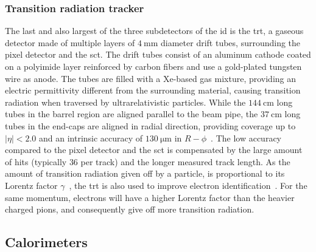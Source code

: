 \subsubsection{Transition radiation tracker}

The last and also largest of the three subdetectors of the \gls{id} is the \gls{trt}, a gaseous detector made of multiple layers of $\SI{4}{\milli\meter}$ diameter drift tubes, surrounding the pixel detector and the \gls{sct}. The drift tubes consist of an aluminum cathode coated on a polyimide layer reinforced by carbon fibers and use a gold-plated tungsten wire as anode. The tubes are filled with a Xe-based gas mixture, providing an electric permittivity different from the surrounding material, causing transition radiation when traversed by ultrarelativistic particles. While the $\SI{144}{\centi\meter}$ long tubes in the barrel region are aligned parallel to the beam pipe, the $\SI{37}{\centi\meter}$ long tubes in the end-caps are aligned in radial direction, providing coverage up to $\vert\eta\vert <2.0$ and an intrinsic accuracy of $\SI{130}{\micro\meter}$ in $R-\phi$~\cite{Aad:2008zzm}. The low accuracy compared to the pixel detector and the \gls{sct} is compensated by the large amount of hits (typically $36$ per track) and the longer measured track length. As the amount of transition radiation given off by a particle, is proportional to its Lorentz factor $\gamma$~\cite{pdg2020}, the \gls{trt} is also used to improve electron identification~\cite{ATLAS-CONF-2011-128}. For the same momentum, electrons will have a higher Lorentz factor than the heavier charged pions, and consequently give off more transition radiation.

\subsection{Calorimeters}

